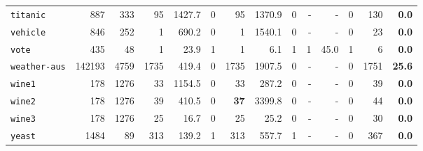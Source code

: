 \begin{tabular}{lccrrrrrrrrrrr}
\texttt{titanic} & \multicolumn{1}{r}{887} & \multicolumn{1}{r}{333}  & 95 & 1427.7 & 0 & 95 & 1370.9 & 0 & - & - & 0 & 130 & \textbf{0.0}\\
\texttt{vehicle} & \multicolumn{1}{r}{846} & \multicolumn{1}{r}{252}  & 1 & 690.2 & 0 & 1 & 1540.1 & 0 & - & - & 0 & 23 & \textbf{0.0}\\
\texttt{vote} & \multicolumn{1}{r}{435} & \multicolumn{1}{r}{48}  & 1 & 23.9 & 1 & 1 & 6.1 & 1 & 1 & 45.0 & 1 & 6 & \textbf{0.0}\\
\texttt{weather-aus} & \multicolumn{1}{r}{142193} & \multicolumn{1}{r}{4759}  & 1735 & 419.4 & 0 & 1735 & 1907.5 & 0 & - & - & 0 & 1751 & \textbf{25.6}\\
\texttt{wine1} & \multicolumn{1}{r}{178} & \multicolumn{1}{r}{1276}  & 33 & 1154.5 & 0 & 33 & 287.2 & 0 & - & - & 0 & 39 & \textbf{0.0}\\
\texttt{wine2} & \multicolumn{1}{r}{178} & \multicolumn{1}{r}{1276}  & 39 & 410.5 & 0 & \textbf{37} & 3399.8 & 0 & - & - & 0 & 44 & \textbf{0.0}\\
\texttt{wine3} & \multicolumn{1}{r}{178} & \multicolumn{1}{r}{1276}  & 25 & 16.7 & 0 & 25 & 25.2 & 0 & - & - & 0 & 30 & \textbf{0.0}\\
\texttt{yeast} & \multicolumn{1}{r}{1484} & \multicolumn{1}{r}{89}  & 313 & 139.2 & 1 & 313 & 557.7 & 1 & - & - & 0 & 367 & \textbf{0.0}\\
\bottomrule
\end{tabular}
